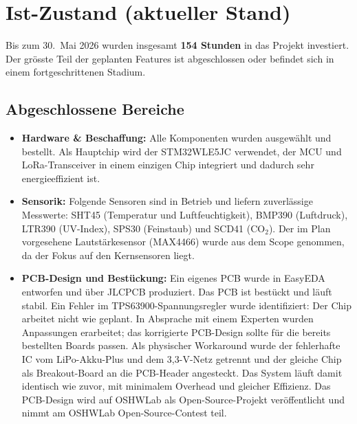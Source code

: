 \documentclass[11pt,a4paper]{scrartcl}
\begin{document}
\section{Ist-Zustand (aktueller Stand)}

Bis zum 30.\ Mai 2026 wurden insgesamt \textbf{154 Stunden} in das Projekt investiert.
Der grösste Teil der geplanten Features ist abgeschlossen oder befindet sich in einem
fortgeschrittenen Stadium.

\subsection{Abgeschlossene Bereiche}

\begin{itemize}
  \item \textbf{Hardware \& Beschaffung:} Alle Komponenten wurden ausgewählt und bestellt.
        Als Hauptchip wird der STM32WLE5JC verwendet, der MCU und LoRa-Transceiver
        in einem einzigen Chip integriert und dadurch sehr energieeffizient ist.

  \item \textbf{Sensorik:} Folgende Sensoren sind in Betrieb und liefern zuverlässige
        Messwerte: SHT45 (Temperatur und Luftfeuchtigkeit), BMP390 (Luftdruck),
        LTR390 (UV-Index), SPS30 (Feinstaub) und SCD41 (CO${}_2$).
        Der im Plan vorgesehene Lautstärkesensor (MAX4466) wurde aus dem Scope
        genommen, da der Fokus auf den Kernsensoren liegt.

  \item \textbf{PCB-Design und Bestückung:} Ein eigenes PCB wurde in EasyEDA entworfen
        und über JLCPCB produziert. Das PCB ist bestückt und läuft stabil.
        Ein Fehler im TPS63900-Spannungsregler wurde identifiziert: Der Chip arbeitet
        nicht wie geplant. In Absprache mit einem Experten wurden Anpassungen erarbeitet;
        das korrigierte PCB-Design sollte für die bereits bestellten Boards passen.
        Als physischer Workaround wurde der fehlerhafte IC vom LiPo-Akku-Plus und dem
        3{,}3-V-Netz getrennt und der gleiche Chip als Breakout-Board an die PCB-Header
        angesteckt. Das System läuft damit identisch wie zuvor, mit minimalem
        Overhead und gleicher Effizienz.
        Das PCB-Design wird auf OSHWLab als Open-Source-Projekt veröffentlicht und
        nimmt am OSHWLab Open-Source-Contest teil.


\end{itemize}
\end{document}

